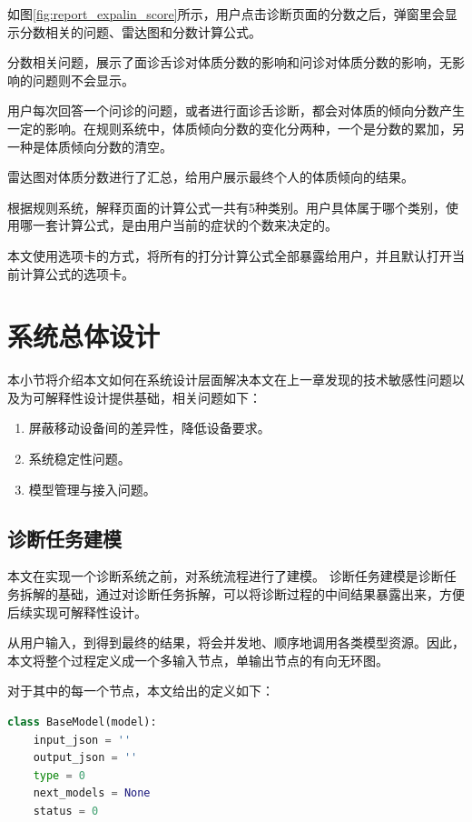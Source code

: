 如图\ref{fig:report_expalin_score}所示，用户点击诊断页面的分数之后，弹窗里会显示分数相关的问题、雷达图和分数计算公式。

分数相关问题，展示了面诊舌诊对体质分数的影响和问诊对体质分数的影响，无影响的问题则不会显示。

用户每次回答一个问诊的问题，或者进行面诊舌诊断，都会对体质的倾向分数产生一定的影响。在规则系统中，体质倾向分数的变化分两种，一个是分数的累加，另一种是体质倾向分数的清空。

雷达图对体质分数进行了汇总，给用户展示最终个人的体质倾向的结果。

根据规则系统，解释页面的计算公式一共有5种类别。用户具体属于哪个类别，使用哪一套计算公式，是由用户当前的症状的个数来决定的。

本文使用选项卡的方式，将所有的打分计算公式全部暴露给用户，并且默认打开当前计算公式的选项卡。


\section{系统总体设计}

本小节将介绍本文如何在系统设计层面解决本文在上一章发现的技术敏感性问题以及为可解释性设计提供基础，相关问题如下：

\begin{enumerate}
    \item 屏蔽移动设备间的差异性，降低设备要求。
    \item 系统稳定性问题。
    \item 模型管理与接入问题。
\end{enumerate}


\subsection{诊断任务建模}
本文在实现一个诊断系统之前，对系统流程进行了建模。
诊断任务建模是诊断任务拆解的基础，通过对诊断任务拆解，可以将诊断过程的中间结果暴露出来，方便后续实现可解释性设计。

从用户输入，到得到最终的结果，将会并发地、顺序地调用各类模型资源。因此，本文将整个过程定义成一个多输入节点，单输出节点的有向无环图。

对于其中的每一个节点，本文给出的定义如下：

\begin{lstlisting}[language={Python}, title=model.py]
class BaseModel(model):
    input_json = ''
    output_json = ''
    type = 0
    next_models = None
    status = 0
    
\end{lstlisting}

